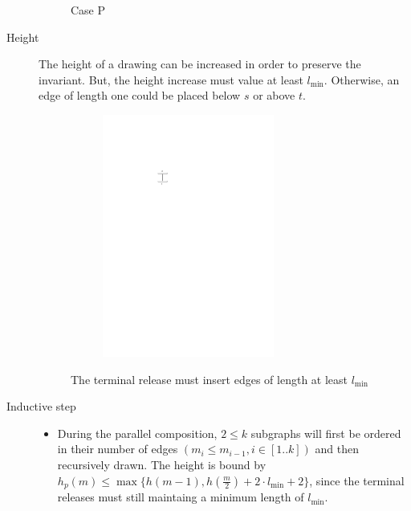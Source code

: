 \begin{description}
\begin{figure}[H]
	\caption{Case P}\label{im:SPm_basecase}
\end{figure}
	\item[Height] The height of a drawing can be increased in order to preserve the invariant. But, the height increase must value at least $l_{\min}$. Otherwise, an edge of length one could be placed below $s$ or above $t$.
\begin{figure}[H]
	\centering
	\begin{subfigure}{0.4\linewidth}
		\centering
		\includegraphics[width=0.7\textwidth,page=9]{drawings/2-trees.pdf}
	\end{subfigure}
	\caption{The terminal release must insert edges of length at least $l_{\min}$}\label{im:SPm_terminal-release}
\end{figure}
	\item[Inductive step] 
	\begin{itemize}
		\item During the parallel composition, $2\leq k$ subgraphs will first be ordered in their number of edges $(m_i \leq m_{i-1}, i \in[1..k])$ and then recursively drawn. The height is bound by $h_p(m)\leq\max\{h(m-1),h\left(\frac{m}{2}\right)+2\cdot l_{\min}+2\}$, since the terminal releases must still maintaing a minimum length of $l_{\min}$.
	\begin{figure}[H]
		\centering
		\begin{subfigure}{0.4\linewidth}

\end{subfigure}
\end{figure}
\end{itemize}
\end{description}
